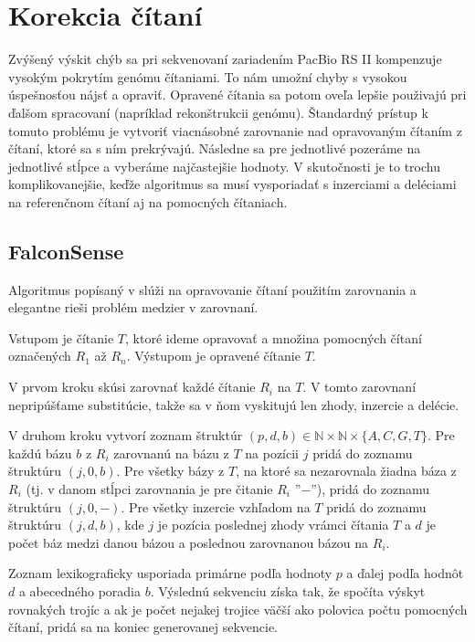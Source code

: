 \section{Korekcia čítaní}

Zvýšený výskit chýb sa pri sekvenovaní zariadením PacBio RS II kompenzuje vysokým pokrytím genómu čítaniami. To nám umožní chyby s vysokou úspešnosťou nájsť a opraviť. Opravené čítania sa potom oveľa lepšie použivajú pri ďalšom spracovaní (napríklad rekonštrukcii genómu). Štandardný prístup k tomuto problému je vytvoriť viacnásobné zarovnanie nad opravovaným čítaním z čítaní, ktoré sa s ním prekrývajú. Následne sa pre jednotlivé pozeráme na jednotlivé stĺpce a vyberáme najčastejšie hodnoty. V skutočnosti je to trochu komplikovanejšie, keďže algoritmus sa musí vysporiadať s inzerciami a deléciami na referenčnom čítaní aj na pomocných čítaniach.

\subsection{FalconSense}

Algoritmus popísaný v \citep{berlin2015assembling} slúži na opravovanie čítaní použitím zarovnania a elegantne rieši problém medzier v zarovnaní. 

Vstupom je čítanie $T$, ktoré ideme opravovať a množina pomocných čítaní označených $R_1$ až $R_n$. Výstupom je opravené čítanie $T$.

V prvom kroku skúsi zarovnať každé čítanie $R_i$ na $T$. V tomto zarovnaní nepripúšťame substitúcie, takže sa v ňom vyskitujú len zhody, inzercie a delécie.

V druhom kroku vytvorí zoznam štruktúr $(p, d, b) \in  \mathbb{N} \times \mathbb{N} \times \{A, C, G, T\}$. Pre každú bázu $b$ z $R_i$ zarovnanú na bázu z $T$ na pozícii $j$ pridá do zoznamu štruktúru $(j, 0, b)$. Pre všetky bázy z $T$, na ktoré sa nezarovnala žiadna báza z $R_i$ (tj. v danom stĺpci zarovnania je pre čitanie $R_i$ ''$-$''), pridá do zoznamu štruktúru $(j, 0, -)$. Pre všetky inzercie vzhľadom na $T$ pridá do zoznamu štruktúru $(j, d, b)$, kde $j$ je pozícia poslednej zhody vrámci čítania $T$ a $d$ je počet báz medzi danou bázou a poslednou zarovnanou bázou na $R_i$. 

Zoznam lexikograficky usporiada primárne podľa hodnoty $p$ a ďalej podľa hodnôt $d$ a abecedného poradia $b$. Výslednú sekvenciu získa tak, že spočíta výskyt rovnakých trojíc a ak je počet nejakej trojice väčší ako polovica počtu pomocných čítaní, pridá sa na koniec generovanej sekvencie.

